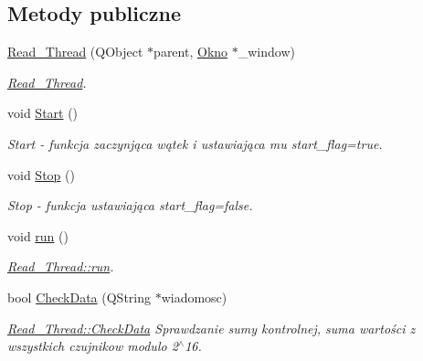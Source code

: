 \subsection*{Metody publiczne}
\begin{DoxyCompactItemize}
\item 
\hyperlink{class_read___thread_a75267b0bd2c0061ff8998a51470de609}{Read\+\_\+\+Thread} (Q\+Object $\ast$parent, \hyperlink{class_okno}{Okno} $\ast$\+\_\+window)
\begin{DoxyCompactList}\small\item\em \hyperlink{class_read___thread}{Read\+\_\+\+Thread}. \end{DoxyCompactList}\item 
void \hyperlink{class_read___thread_aac135df28f316466b880187097a268fd}{Start} ()\hypertarget{class_read___thread_aac135df28f316466b880187097a268fd}{}\label{class_read___thread_aac135df28f316466b880187097a268fd}

\begin{DoxyCompactList}\small\item\em Start -\/ funkcja zaczynjąca wątek i ustawiająca mu start\+\_\+flag=true. \end{DoxyCompactList}\item 
void \hyperlink{class_read___thread_ab7f432f2160c3e884af7a80387764977}{Stop} ()\hypertarget{class_read___thread_ab7f432f2160c3e884af7a80387764977}{}\label{class_read___thread_ab7f432f2160c3e884af7a80387764977}

\begin{DoxyCompactList}\small\item\em Stop -\/ funkcja ustawiająca start\+\_\+flag=false. \end{DoxyCompactList}\item 
void \hyperlink{class_read___thread_a261a3cc9c3dc6abe61946123c3de76dc}{run} ()
\begin{DoxyCompactList}\small\item\em \hyperlink{class_read___thread_a261a3cc9c3dc6abe61946123c3de76dc}{Read\+\_\+\+Thread\+::run}. \end{DoxyCompactList}\item 
bool \hyperlink{class_read___thread_a4b81499a6d426573733446d4af8e7b07}{Check\+Data} (Q\+String $\ast$wiadomosc)
\begin{DoxyCompactList}\small\item\em \hyperlink{class_read___thread_a4b81499a6d426573733446d4af8e7b07}{Read\+\_\+\+Thread\+::\+Check\+Data} Sprawdzanie sumy kontrolnej, suma wartości z wszystkich czujnikow modulo 2$^\wedge$16. \end{DoxyCompactList}\end{DoxyCompactItemize}

